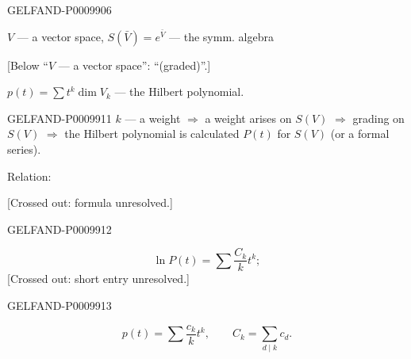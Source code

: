 \begin{GelfandAdjacentEvidence}{GELFAND-P000990}{6}


$V$ --- a vector space, \qquad $S(\bar V)=e^{\bar V}$ --- the symm. algebra

[Below “$V$ --- a vector space”: “(graded)”.]

$p(t)=\sum t^k\dim V_k$ --- the Hilbert polynomial.
\end{GelfandAdjacentEvidence}



\begin{GelfandAdjacentEvidence}{GELFAND-P000991}{1}
$k$ --- a weight $\Rightarrow$ a weight arises on $S(V)$
$\Rightarrow$ grading on $S(V)$
$\Rightarrow$ the Hilbert polynomial is calculated $P(t)$ for $S(V)$
(or a formal series).

Relation:

[Crossed out: formula unresolved.]
\end{GelfandAdjacentEvidence}
\begin{GelfandAdjacentEvidence}{GELFAND-P000991}{2}

\[
\ln P(t)=\sum\frac{C_k}{k}t^k;
\]
[Crossed out: short entry unresolved.]
\end{GelfandAdjacentEvidence}
\begin{GelfandAdjacentEvidence}{GELFAND-P000991}{3}

\[
p(t)=\sum\frac{c_k}{k}t^k,\qquad C_k=\sum_{d\mid k}c_d.
\]
\end{GelfandAdjacentEvidence}
